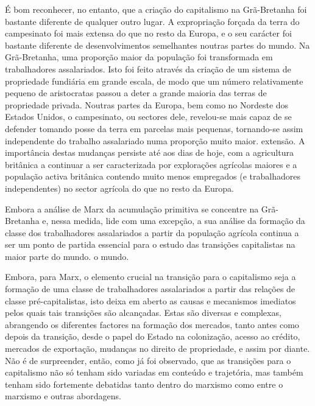 É bom reconhecer, no entanto, que a criação do capitalismo na Grã-Bretanha foi bastante diferente de qualquer outro lugar. A expropriação forçada da terra do campesinato foi mais extensa do que no resto da Europa, e o seu carácter foi bastante diferente de desenvolvimentos semelhantes noutras partes do mundo. Na Grã-Bretanha, uma proporção maior da população foi transformada em trabalhadores assalariados. Isto foi feito através da criação de um sistema de propriedade fundiária em grande escala, de modo que um número relativamente pequeno de aristocratas passou a deter a grande maioria das terras de propriedade privada. Noutras partes da Europa, bem como no Nordeste dos Estados Unidos, o campesinato, ou sectores dele, revelou-se mais capaz de se defender tomando posse da terra em parcelas mais pequenas, tornando-se assim independente do trabalho assalariado numa proporção muito maior. extensão. A importância destas mudanças persiste até aos dias de hoje, com a agricultura britânica a continuar a ser caracterizada por explorações agrícolas maiores e a população activa britânica contendo muito menos empregados (e trabalhadores independentes) no sector agrícola do que no resto da Europa.
 \par 
Embora a análise de Marx da acumulação primitiva se concentre na Grã-Bretanha e, nessa medida, lide com uma excepção, a sua análise da formação da classe dos trabalhadores assalariados a partir da população agrícola continua a ser um ponto de partida essencial para o estudo das transições capitalistas na maior parte do mundo. o mundo.
 \par 
Embora, para Marx, o elemento crucial na transição para o capitalismo seja a formação de uma classe de trabalhadores assalariados a partir das relações de classe pré-capitalistas, isto deixa em aberto as causas e mecanismos imediatos pelos quais tais transições são alcançadas. Estas são diversas e complexas, abrangendo os diferentes factores na formação dos mercados, tanto antes como depois da transição, desde o papel do Estado na colonização, acesso ao crédito, mercados de exportação, mudanças no direito de propriedade, e assim por diante. Não é de surpreender, então, como já foi observado, que as transições para o capitalismo não só tenham sido variadas em conteúdo e trajetória, mas também tenham sido fortemente debatidas tanto dentro do marxismo como entre o marxismo e outras abordagens.
 \par 
